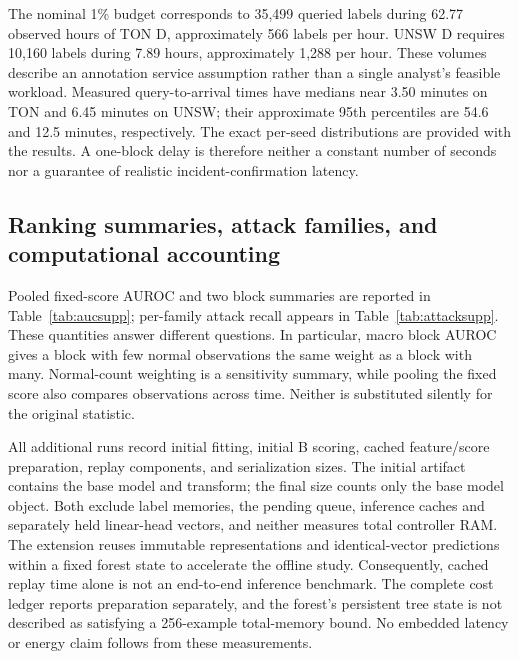 The nominal 1\% budget corresponds to 35,499 queried labels during 62.77 observed hours of TON D, approximately 566 labels per hour. UNSW D requires 10,160 labels during 7.89 hours, approximately 1,288 per hour. These volumes describe an annotation service assumption rather than a single analyst's feasible workload. Measured query-to-arrival times have medians near 3.50 minutes on TON and 6.45 minutes on UNSW; their approximate 95th percentiles are 54.6 and 12.5 minutes, respectively. The exact per-seed distributions are provided with the results. A one-block delay is therefore neither a constant number of seconds nor a guarantee of realistic incident-confirmation latency.

\subsection{Ranking summaries, attack families, and computational accounting}
Pooled fixed-score AUROC and two block summaries are reported in Table~\ref{tab:aucsupp}; per-family attack recall appears in Table~\ref{tab:attacksupp}. These quantities answer different questions. In particular, macro block AUROC gives a block with few normal observations the same weight as a block with many. Normal-count weighting is a sensitivity summary, while pooling the fixed score also compares observations across time. Neither is substituted silently for the original statistic.

All additional runs record initial fitting, initial B scoring, cached feature/score preparation, replay components, and serialization sizes. The initial artifact contains the base model and transform; the final size counts only the base model object. Both exclude label memories, the pending queue, inference caches and separately held linear-head vectors, and neither measures total controller RAM. The extension reuses immutable representations and identical-vector predictions within a fixed forest state to accelerate the offline study. Consequently, cached replay time alone is not an end-to-end inference benchmark. The complete cost ledger reports preparation separately, and the forest's persistent tree state is not described as satisfying a 256-example total-memory bound. No embedded latency or energy claim follows from these measurements.
